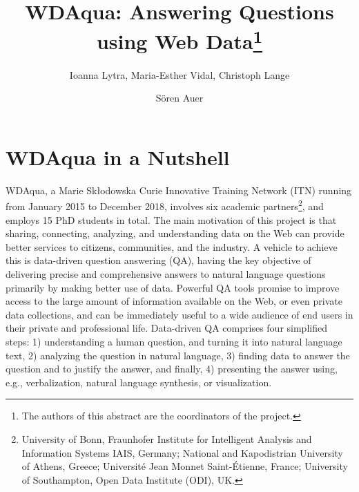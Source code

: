\documentclass[a4paper]{llncs}
\begin{document}
	
	\mainmatter
	\title{WDAqua: Answering Questions using Web Data\thanks{The authors of this abstract are the coordinators of the project.}}
	
	\author{Ioanna Lytra, Maria-Esther Vidal, Christoph Lange \and S{\"o}ren Auer}
	
	\maketitle
	
	\section{WDAqua in a Nutshell} \label{sec:intro}
	WDAqua, a Marie Sk{\l}odowska Curie Innovative Training Network (ITN) running from January 2015 to December 2018, involves six academic partners\footnote{University of Bonn, Fraunhofer Institute for Intelligent Analysis and Information Systems IAIS, Germany; National and Kapodistrian University of Athens, Greece; Universit{\'e} Jean Monnet Saint-{\'E}tienne, France; University of Southampton, Open Data Institute (ODI), UK.}, and employs 15 PhD students in total.
        The main motivation of this project is that sharing, connecting, analyzing, and understanding data on the Web can provide better services to citizens, communities, and the industry.
        A vehicle to achieve this is data-driven question answering (QA), having the key objective of delivering precise and comprehensive answers to natural language questions primarily by making better use of data.
        Powerful QA tools promise to improve access to the large amount of information available on the Web, or even private data collections, and can be immediately useful to a wide audience of end users in their private and professional life.
        Data-driven QA comprises four simplified steps: 1) understanding a human question, and turning it into natural language text, 2) analyzing the question in natural language, 3) finding data to answer the question and to justify the answer, and finally, 4) presenting the answer using, e.g., verbalization, natural language synthesis, or visualization.
	
\end{document}
